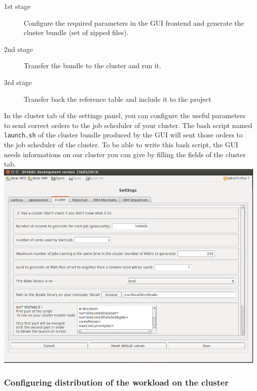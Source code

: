 \begin{description}
\item [{1st stage}] Configure the required parameters in the GUI frontend
and generate the cluster bundle (set of zipped files).
\item [{2nd stage}] Transfer the bundle to the cluster and run it.
\item [{3rd stage}] Transfer back the reference table and include it to
the project
\end{description}
In the cluster tab of the settings panel, you can configure the useful
parameters to send correct orders to the job scheduler of your cluster.
The bash script named \texttt{launch.sh} of the cluster bundle produced
by the GUI will sent those orders to the job scheduler of the cluster.
To be able to write this bash script, the GUI needs informations on
our cluster you can give by filling the fields of the cluster tab.
\\


\includegraphics[scale=0.33]{gui_pictures/Capture-DIYABC-cluster}
\\



\subsubsection{Configuring distribution of the workload on the cluster}

